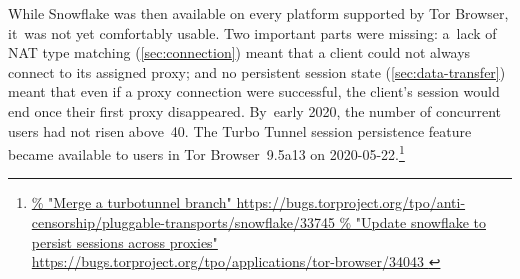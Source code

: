 \documentclass[letterpaper,twocolumn]{article}
\newlength{\urlfootnotesize}
\newcommand{\urlfootnote}[1]{\footnote{
\raggedright\hangindent\footnotemargin%
\fontsize{\urlfootnotesize}{\urlfootnotesize}\selectfont%
\url{#1}
}}
\begin{document}
While Snowflake was then available
on every platform supported by Tor Browser,
it~was not yet comfortably usable.
Two important parts were missing:
a~lack of NAT type matching (\autoref{sec:connection})
meant that a client could not always connect to its assigned proxy;
and no persistent session state (\autoref{sec:data-transfer})
meant that even if a proxy connection were successful,
the client's session would end once their first proxy disappeared.
By~early 2020,
the number of concurrent users
had not risen above~40.
%
%
The Turbo Tunnel session persistence feature
became available to users in Tor Browser~9.5a13
on \mbox{2020-05-22}.\urlfootnote{
https://bugs.torproject.org/tpo/anti-censorship/pluggable-transports/snowflake/33745
}
\end{document}
